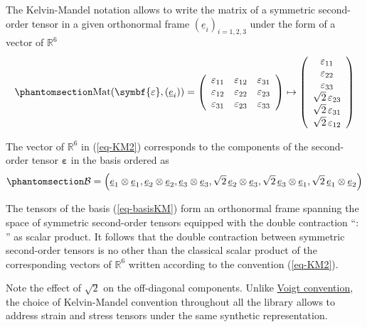 \documentclass[
  a4paper,
  numbers=noendperiod,
  DIV=12]{scrreprt}
\newcommand{\R}{{\mathbb{{R}}}}
\newcommand{\uu}[1]{{\symbf{{#1}}}}
\newcommand{\uv}[1]{{\underline{{#1}}}}
\newcommand{\ve}[1]{{\uv{{e}}_{{#1}}}}
\newcommand{\eps}{{\uu{{\varepsilon}}}}
\DeclareMathOperator{\Mat}{Mat}
\begin{document}
The Kelvin-Mandel notation allows to write the matrix of a symmetric
second-order tensor in a given orthonormal frame
\mbox{$(\ve{i})_{i=1,2,3}$} under the form of a vector of \(\R^6\)
\begin{equation}\protect\phantomsection\label{eq-KM2}{
   \Mat(\eps,(\ve{i}))=
   \left(
   \begin{array}{ccc}
   \varepsilon_{11} & \varepsilon_{12} & \varepsilon_{31}\\
   \varepsilon_{12} & \varepsilon_{22} & \varepsilon_{23}\\
   \varepsilon_{31} & \varepsilon_{23} & \varepsilon_{33}
   \end{array}
   \right)
   \mapsto
   \left(
   \begin{array}{c}
   \varepsilon_{11} \\
   \varepsilon_{22} \\
   \varepsilon_{33} \\
   \sqrt{2}\,\varepsilon_{23} \\
   \sqrt{2}\,\varepsilon_{31} \\
   \sqrt{2}\,\varepsilon_{12}
   \end{array}
   \right)
}\end{equation}

The vector of \(\R^6\) in (\ref{eq-KM2}) corresponds to the components
of the second-order tensor \(\eps\) in the basis ordered as
\begin{equation}\protect\phantomsection\label{eq-basisKM}{
\mathcal{B}=\left(
\ve{1}\otimes\ve{1},
\ve{2}\otimes\ve{2},
\ve{3}\otimes\ve{3},
\sqrt{2}\,\ve{2}\otimes\ve{3},
\sqrt{2}\,\ve{3}\otimes\ve{1},
\sqrt{2}\,\ve{1}\otimes\ve{2}
\right)
}\end{equation}

The tensors of the basis (\ref{eq-basisKM}) form an orthonormal frame
spanning the space of symmetric second-order tensors equipped with the
double contraction ``\(:\)'' as scalar product. It follows that the
double contraction between symmetric second-order tensors is no other
than the classical scalar product of the corresponding vectors of
\(\R^6\) written according to the convention (\ref{eq-KM2}).

\begin{tcolorbox}[enhanced jigsaw, arc=.35mm, bottomrule=.15mm, bottomtitle=1mm, breakable, colback=white, colbacktitle=quarto-callout-note-color!10!white, colframe=quarto-callout-note-color-frame, coltitle=black, left=2mm, leftrule=.75mm, opacityback=0, opacitybacktitle=0.6, rightrule=.15mm, title=\textcolor{quarto-callout-note-color}{\faInfo}\hspace{0.5em}{Note}, titlerule=0mm, toprule=.15mm, toptitle=1mm]

Note the effect of \(\sqrt{2}\) on the off-diagonal components. Unlike
\href{https://en.wikipedia.org/wiki/Voigt_notation}{Voigt convention},
the choice of Kelvin-Mandel convention throughout all the library allows
to address strain and stress tensors under the same synthetic
representation.

\end{tcolorbox}
\end{document}
